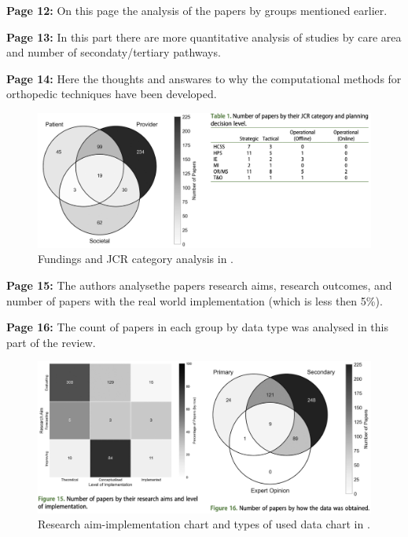     \textbf{Page 12:}
    On this page the analysis of the papers by groups mentioned earlier.
    
    \textbf{Page 13:}
    In this part there are more quantitative analysis of studies by care area and number of secondaty/tertiary pathways.
    
    \textbf{Page 14:}
    Here the thoughts and answares to why the computational methods for orthopedic techniques have been developed.
    \begin{figure}[H]
        \centering
        \includegraphics[width=1\textwidth]{figures/0005_SR02GB23/fig4.png}
        \caption{Fundings and JCR category analysis in \cite{x122}.}
        \label{fig4:SR02GB23}
    \end{figure}

    \textbf{Page 15:}
    The authors analysethe papers research aims, research outcomes, and number of papers with the real world implementation (which is less then 5\%).

    \textbf{Page 16:}
    The count of papers in each group by data type was analysed in this part of the review. 
    \begin{figure}[H]
        \centering
        \includegraphics[width=1\textwidth]{figures/0005_SR02GB23/fig5.png}
        \caption{Research aim-implementation chart and types of used data chart in \cite{x122}.}
        \label{fig5:SR02GB23}
    \end{figure}

